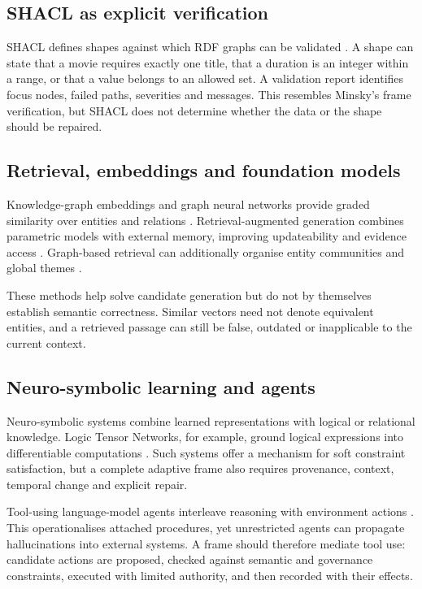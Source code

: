 \documentclass[11pt,a4paper]{article}
\begin{document}
\subsection{SHACL as explicit verification}

SHACL defines shapes against which RDF graphs can be validated
\citep{shacl2017}. A shape can state that a movie requires exactly one title,
that a duration is an integer within a range, or that a value belongs to an
allowed set. A validation report identifies focus nodes, failed paths,
severities and messages. This resembles Minsky's frame verification, but SHACL
does not determine whether the data or the shape should be repaired.

\subsection{Retrieval, embeddings and foundation models}

Knowledge-graph embeddings and graph neural networks provide graded similarity
over entities and relations \citep{nickel2016review,hamilton2017representation}.
Retrieval-augmented generation combines parametric models with external memory,
improving updateability and evidence access \citep{lewis2020rag}. Graph-based
retrieval can additionally organise entity communities and global themes
\citep{edge2024graphrag}.

These methods help solve candidate generation but do not by themselves establish
semantic correctness. Similar vectors need not denote equivalent entities, and
a retrieved passage can still be false, outdated or inapplicable to the current
context.

\subsection{Neuro-symbolic learning and agents}

Neuro-symbolic systems combine learned representations with logical or
relational knowledge. Logic Tensor Networks, for example, ground logical
expressions into differentiable computations \citep{badreddine2022ltn}. Such
systems offer a mechanism for soft constraint satisfaction, but a complete
adaptive frame also requires provenance, context, temporal change and explicit
repair.

Tool-using language-model agents interleave reasoning with environment actions
\citep{yao2023react}. This operationalises attached procedures, yet unrestricted
agents can propagate hallucinations into external systems. A frame should
therefore mediate tool use: candidate actions are proposed, checked against
semantic and governance constraints, executed with limited authority, and then
recorded with their effects.
\end{document}
